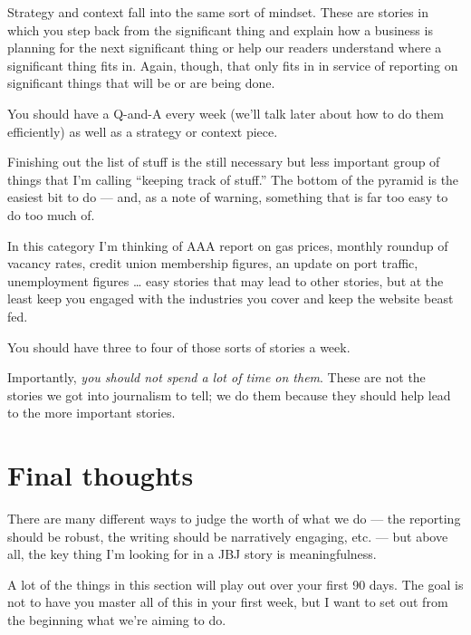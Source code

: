 \documentclass[
  11pt,
  american,
  letterpaperpaper,
  extrafontsizes,onecolumn,openright
  ]{memoir}
\begin{document}
Strategy and context fall into the same sort of mindset. These are stories in which you step back from the significant thing and explain how a business is planning for the next significant thing or help our readers understand where a significant thing fits in. Again, though, that only fits in in service of reporting on significant things that will be or are being done.

You should have a Q-and-A every week (we'll talk later about how to do them efficiently) as well as a strategy or context piece.

Finishing out the list of stuff is the still necessary but less important group of things that I'm calling \enquote{keeping track of stuff.} The bottom of the pyramid is the easiest bit to do --- and, as a note of warning, something that is far too easy to do too much of.

In this category I'm thinking of AAA report on gas prices, monthly roundup of vacancy rates, credit union membership figures, an update on port traffic, unemployment figures \ldots{} easy stories that may lead to other stories, but at the least keep you engaged with the industries you cover and keep the website beast fed.

You should have three to four of those sorts of stories a week.

Importantly, \emph{you should not spend a lot of time on them}. These are not the stories we got into journalism to tell; we do them because they should help lead to the more important stories.

\hypertarget{final-thoughts}{%
\section*{Final thoughts}\label{final-thoughts}}

There are many different ways to judge the worth of what we do --- the reporting should be robust, the writing should be narratively engaging, etc. --- but above all, the key thing I'm looking for in a JBJ story is meaningfulness.

\leavevmode{}%
\begin{greybox}[frametitle=Onboarding Path]
A lot of the things in this section will play out over your first 90 days. The goal is not to have you master all of this in your first week, but I want to set out from the beginning what we're aiming to do.

\end{greybox}
\end{document}

